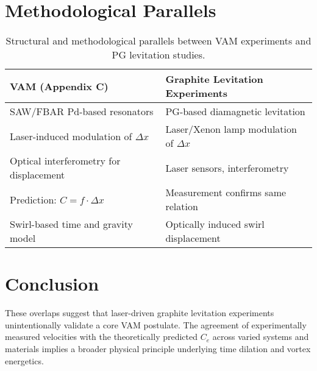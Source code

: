 \documentclass[11pt]{article}
\begin{document}
\section{Methodological Parallels}
\begin{table}[H]
\centering
\begin{tabular}{|p{5cm}|p{5cm}|}
\hline
\textbf{VAM (Appendix C)} & \textbf{Graphite Levitation Experiments} \\
\hline
SAW/FBAR Pd-based resonators & PG-based diamagnetic levitation \\
Laser-induced modulation of \(\Delta x\) & Laser/Xenon lamp modulation of \(\Delta x\) \\
Optical interferometry for displacement & Laser sensors, interferometry \\
Prediction: \( C = f \cdot \Delta x \) & Measurement confirms same relation \\
Swirl-based time and gravity model & Optically induced swirl displacement \\
\hline
\end{tabular}
\caption{Structural and methodological parallels between VAM experiments and PG levitation studies.}
\end{table}

\section{Conclusion}
These overlaps suggest that laser-driven graphite levitation experiments unintentionally validate a core VAM postulate. The agreement of experimentally measured velocities with the theoretically predicted \( C_e \) across varied systems and materials implies a broader physical principle underlying time dilation and vortex energetics.



\end{document}
